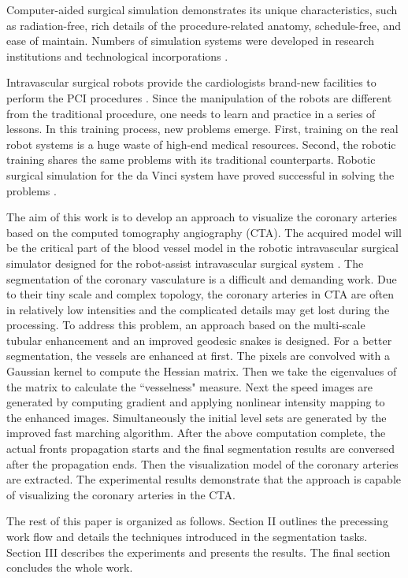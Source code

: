 Computer-aided surgical simulation demonstrates its unique characteristics, such as radiation-free, rich details of the procedure-related anatomy, schedule-free, and ease of maintain.
Numbers of simulation systems were developed in research institutions \cite{Dawson1996DK,Wang1997ICard,Cotin2000ICTS} and technological incorporations \cite{CAEWeb,MenticeWeb,SimbionixWeb}.

Intravascular surgical robots provide the cardiologists brand-new facilities to perform the PCI procedures \cite{NIOBEWeb,HansenWeb,Beyar2006RNS,Smilowitz2012}.
Since the manipulation of the robots are different from the traditional procedure, one needs to learn and practice in a series of lessons.
In this training process, new problems emerge.
First, training on the real robot systems is a huge waste of high-end medical resources.
Second, the robotic training shares the same problems with its traditional counterparts.
Robotic surgical simulation for the da Vinci system have proved successful in solving the problems \cite{Liss2012,Kesavadas2011}.

The aim of this work is to develop an approach to visualize the coronary arteries based on the computed tomography angiography (CTA).
The acquired model will be the critical part of the blood vessel model in the robotic intravascular surgical simulator designed for the robot-assist intravascular surgical system \cite{Ji2011EMBC}.
The segmentation of the coronary vasculature is a difficult and demanding work.
Due to their tiny scale and complex topology, the coronary arteries in CTA are often in relatively low intensities and the complicated details may get lost during the processing.
To address this problem, an approach based on the multi-scale tubular enhancement and an improved geodesic snakes is designed.
For a better segmentation, the vessels are enhanced at first.
The pixels are convolved with a Gaussian kernel to compute the Hessian matrix.
Then we take the eigenvalues of the matrix to calculate the ``vesselness" measure.
Next the speed images are generated by computing gradient and applying nonlinear intensity mapping to the enhanced images.
Simultaneously the initial level sets are generated by the improved fast marching algorithm.
After the above computation complete, the actual fronts propagation starts and the final segmentation results are conversed after the propagation ends.
Then the visualization model of the coronary arteries are extracted.
The experimental results demonstrate that the approach is capable of visualizing the coronary arteries in the CTA.

The rest of this paper is organized as follows.
Section II outlines the precessing work flow and details the techniques introduced in the segmentation tasks.
Section III describes the experiments and presents the results.
The final section concludes the whole work.